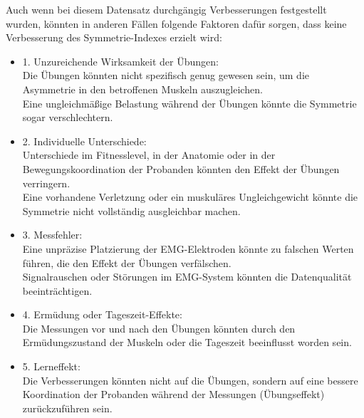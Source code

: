 Auch wenn bei diesem Datensatz durchgängig Verbesserungen festgestellt wurden, könnten in anderen Fällen folgende Faktoren dafür sorgen, dass keine Verbesserung des Symmetrie-Indexes erzielt wird:

\begin{itemize}
    \item 1. Unzureichende Wirksamkeit der Übungen:\\
    Die Übungen könnten nicht spezifisch genug gewesen sein, um die Asymmetrie in den betroffenen Muskeln auszugleichen.\\
    Eine ungleichmäßige Belastung während der Übungen könnte die Symmetrie sogar verschlechtern.\\
    \item 2. Individuelle Unterschiede: \\
    Unterschiede im Fitnesslevel, in der Anatomie oder in der Bewegungskoordination der Probanden könnten den Effekt der Übungen verringern.\\
    Eine vorhandene Verletzung oder ein muskuläres Ungleichgewicht könnte die Symmetrie nicht vollständig ausgleichbar machen.\\
    \item 3. Messfehler:\\
    Eine unpräzise Platzierung der EMG-Elektroden könnte zu falschen Werten führen, die den Effekt der Übungen verfälschen.\\
    Signalrauschen oder Störungen im EMG-System könnten die Datenqualität beeinträchtigen.\\
    \item 4. Ermüdung oder Tageszeit-Effekte:\\
    Die Messungen vor und nach den Übungen könnten durch den Ermüdungszustand der Muskeln oder die Tageszeit beeinflusst worden sein.\\
    \item 5. Lerneffekt:\\
    Die Verbesserungen könnten nicht auf die Übungen, sondern auf eine bessere Koordination der Probanden während der Messungen (Übungseffekt) zurückzuführen sein.
\end{itemize}



